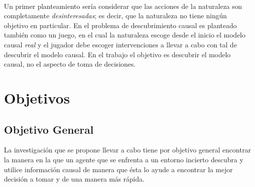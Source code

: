\documentclass[11pt]{article}
\theoremstyle{plain}
\begin{document}
\\
\indent Un primer planteamiento sería considerar que las acciones de la naturaleza son completamente \textit{desinteresadas}; es decir, que la naturaleza no tiene ningún objetivo en particular. En \cite{eberhardt2008causal} el problema de descubrimiento causal es planteado también como un juego, en el cual la naturaleza escoge desde el inicio el modelo causal \textit{real} y el jugador debe escoger intervenciones a llevar a cabo con tal de descubrir el modelo causal. En el trabajo \cite{eberhardt2008causal} el objetivo es descubrir el modelo causal, no el aspecto de toma de decisiones.

\section{Objetivos}
	\subsection{Objetivo General}
	La investigación que se propone llevar a cabo tiene por objetivo general encontrar la manera en la que un agente que se enfrenta a un entorno incierto descubra y utilice información causal de manera que ésta lo ayude a encontrar la mejor decisión a tomar y de una manera más rápida.
\end{document}
